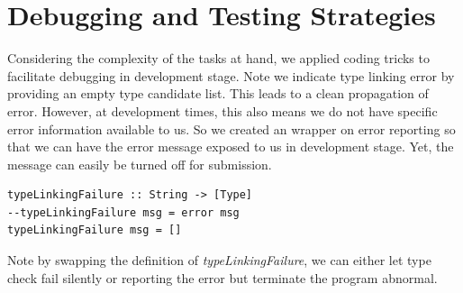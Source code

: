 \documentclass[12pt,letterpaper]{article}
\begin{document}
\section{Debugging and Testing Strategies}
Considering the complexity of the tasks at hand, we applied coding tricks to facilitate debugging in development stage. Note we indicate type linking error by providing an empty type candidate list. This leads to a clean propagation of error. However, at development times, this also means we do not have specific error information available to us. So we created an wrapper on error reporting so that we can have the error message exposed to us in development stage. Yet, the message can easily be turned off for submission.
\begin{lstlisting}
typeLinkingFailure :: String -> [Type]
--typeLinkingFailure msg = error msg
typeLinkingFailure msg = []
\end{lstlisting}

Note by swapping the definition of \emph{typeLinkingFailure}, we can either let type check fail silently or reporting the error but terminate the program abnormal.
\end{document}
